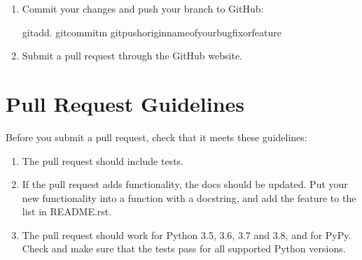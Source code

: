 \documentclass[letterpaper,10pt,english]{sphinxmanual}
\begin{document}
\begin{enumerate}
\begin{sphinxVerbatim}[commandchars=\\\{\}]
\PYGZdl{}flake8actio\PYGZus{}python\PYGZus{}utilstests
\PYGZdl{}pythonsetup.pyorpytest
\PYGZdl{}tox
\end{sphinxVerbatim}

\sphinxAtStartPar
To get flake8 and tox, just pip install them into your virtualenv.

\item {} 
\sphinxAtStartPar
Commit your changes and push your branch to GitHub:

\begin{sphinxVerbatim}[commandchars=\\\{\}]
\PYGZdl{}gitadd.
\PYGZdl{}gitcommit\PYGZhy{}m
\PYGZdl{}gitpushoriginname\PYGZhy{}of\PYGZhy{}your\PYGZhy{}bugfix\PYGZhy{}or\PYGZhy{}feature
\end{sphinxVerbatim}

\item {} 
\sphinxAtStartPar
Submit a pull request through the GitHub website.

\end{enumerate}


\section{Pull Request Guidelines}
\label{\detokenize{contributing:pull-request-guidelines}}
\sphinxAtStartPar
Before you submit a pull request, check that it meets these guidelines:
\begin{enumerate}
%
\item {} 
\sphinxAtStartPar
The pull request should include tests.

\item {} 
\sphinxAtStartPar
If the pull request adds functionality, the docs should be updated. Put
your new functionality into a function with a docstring, and add the
feature to the list in README.rst.

\item {} 
\sphinxAtStartPar
The pull request should work for Python 3.5, 3.6, 3.7 and 3.8, and for PyPy. Check
and make sure that the tests pass for all supported Python versions.

\end{enumerate}
\end{document}
